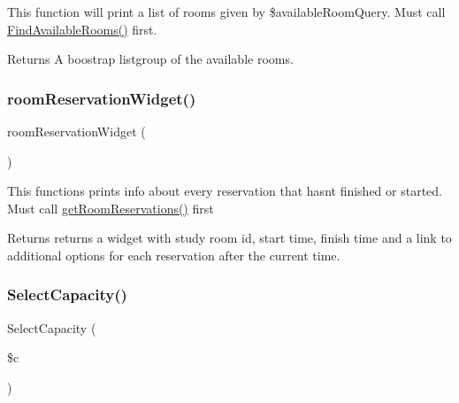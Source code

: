 This function will print a list of rooms given by \$available\+Room\+Query. Must call \mbox{\hyperlink{_room___selection_8class_8php_a65dc1d8579dc730a5a4db6799c7fde4a}{Find\+Available\+Rooms()}} first. \begin{DoxyReturn}{Returns}
A boostrap listgroup of the available rooms. 
\end{DoxyReturn}
\mbox{\label{_room___selection_8class_8php_a1459b40a236d0f61087f7b2e06b5cacf}} 
\subsubsection{\texorpdfstring{roomReservationWidget()}{roomReservationWidget()}}
{\footnotesize\ttfamily room\+Reservation\+Widget (\begin{DoxyParamCaption}{ }\end{DoxyParamCaption})}

This functions prints info about every reservation that hasn\textquotesingle{}t finished or started. Must call \mbox{\hyperlink{_room___selection_8class_8php_ade932fe6af13dca6fad6841780807039}{get\+Room\+Reservations()}} first \begin{DoxyReturn}{Returns}
returns a widget with study room id, start time, finish time and a link to additional options for each reservation after the current time. 
\end{DoxyReturn}
\mbox{\label{_room___selection_8class_8php_a76636000b94ea99486d48b0cf946430a}} 
\subsubsection{\texorpdfstring{SelectCapacity()}{SelectCapacity()}}
{\footnotesize\ttfamily Select\+Capacity (\begin{DoxyParamCaption}\item[{}]{\$c }\end{DoxyParamCaption})}

